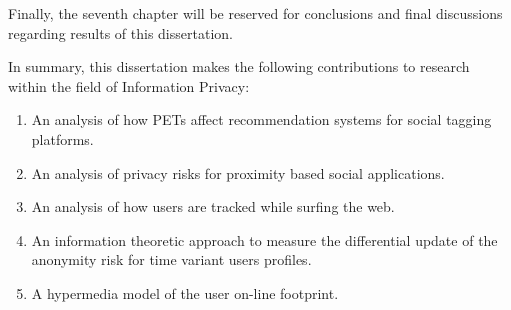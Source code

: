 Finally, the seventh chapter will be reserved for conclusions and final discussions regarding results of this dissertation.

In summary, this dissertation makes the following contributions to research within the field of Information Privacy:

\begin{enumerate}
    \item An analysis of how PETs affect recommendation systems for social tagging platforms.
    \item An analysis of privacy risks for proximity based social applications.
    \item An analysis of how users are tracked while surfing the web.
    \item An information theoretic approach to measure the differential update of the anonymity risk for time variant users profiles.
    \item A hypermedia model of the user on-line footprint.
\end{enumerate}





